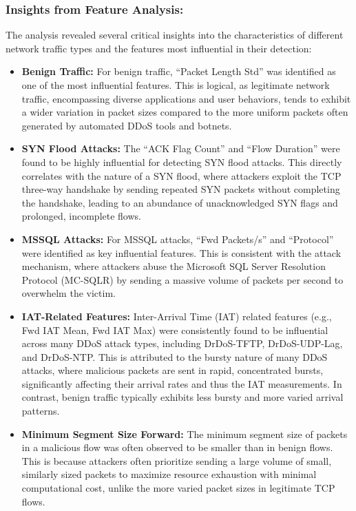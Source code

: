\documentclass[12pt]{report}
\begin{document}
\subsubsection{Insights from Feature Analysis:}

The analysis revealed several critical insights into the characteristics of different network traffic types and the features most influential in their detection:

\begin{itemize}
\item \textbf{Benign Traffic:} For benign traffic, ``Packet Length Std'' was identified as one of the most influential features. This is logical, as legitimate network traffic, encompassing diverse applications and user behaviors, tends to exhibit a wider variation in packet sizes compared to the more uniform packets often generated by automated DDoS tools and botnets.

\item \textbf{SYN Flood Attacks:} The ``ACK Flag Count'' and ``Flow Duration'' were found to be highly influential for detecting SYN flood attacks. This directly correlates with the nature of a SYN flood, where attackers exploit the TCP three-way handshake by sending repeated SYN packets without completing the handshake, leading to an abundance of unacknowledged SYN flags and prolonged, incomplete flows.

\item \textbf{MSSQL Attacks:} For MSSQL attacks, ``Fwd Packets/s'' and ``Protocol'' were identified as key influential features. This is consistent with the attack mechanism, where attackers abuse the Microsoft SQL Server Resolution Protocol (MC-SQLR) by sending a massive volume of packets per second to overwhelm the victim.

\item \textbf{IAT-Related Features:} Inter-Arrival Time (IAT) related features (e.g., Fwd IAT Mean, Fwd IAT Max) were consistently found to be influential across many DDoS attack types, including DrDoS-TFTP, DrDoS-UDP-Lag, and DrDoS-NTP. This is attributed to the bursty nature of many DDoS attacks, where malicious packets are sent in rapid, concentrated bursts, significantly affecting their arrival rates and thus the IAT measurements. In contrast, benign traffic typically exhibits less bursty and more varied arrival patterns.

\item \textbf{Minimum Segment Size Forward:} The minimum segment size of packets in a malicious flow was often observed to be smaller than in benign flows. This is because attackers often prioritize sending a large volume of small, similarly sized packets to maximize resource exhaustion with minimal computational cost, unlike the more varied packet sizes in legitimate TCP flows.
\end{itemize}
\end{document}
